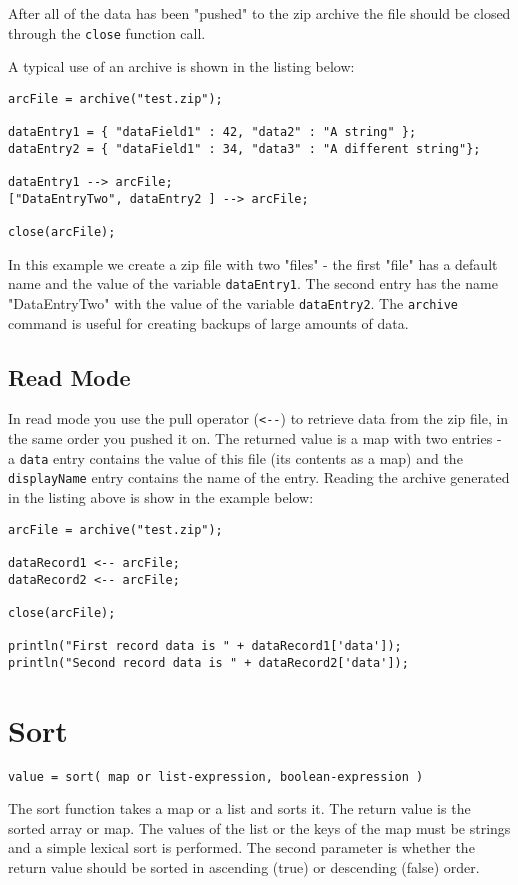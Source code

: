 After all of the data has been "pushed" to the zip archive the file should be closed through the \Verb+close+ function call.

A typical use of an archive is shown in the listing below:
\begin{lstlisting}[caption={Write to Archive example}]
arcFile = archive("test.zip");

dataEntry1 = { "dataField1" : 42, "data2" : "A string" };
dataEntry2 = { "dataField1" : 34, "data3" : "A different string"};

dataEntry1 --> arcFile;
["DataEntryTwo", dataEntry2 ] --> arcFile;

close(arcFile);
\end{lstlisting}

In this example we create a zip file with two "files" - the first "file" has a default name and the value of the variable \Verb+dataEntry1+. The second entry has the name "DataEntryTwo" with the value of the variable \verb+dataEntry2+. The \verb+archive+ command is useful for creating backups of large amounts of \Rapture data.

\subsection{Read Mode}
In read mode you use the pull operator (\Verb+<--+) to retrieve data from the zip file, in the same order you pushed it on. The returned value is a map with two entries - a \verb+data+ entry contains the value of this file (its contents as a map) and the \verb+displayName+ entry contains the name of the entry. Reading the archive generated in the listing above is show in the example below:

\begin{lstlisting}[caption={Read from archive example}]
arcFile = archive("test.zip");

dataRecord1 <-- arcFile;
dataRecord2 <-- arcFile;

close(arcFile);

println("First record data is " + dataRecord1['data']);
println("Second record data is " + dataRecord2['data']);
\end{lstlisting}

\section{Sort}
\begin{Verbatim}
value = sort( map or list-expression, boolean-expression )
\end{Verbatim}
The sort function takes a map or a list and sorts it. The return value is the sorted array or map. The
values of the list or the keys of the map must be strings and a simple lexical sort is performed. The second
parameter is whether the return value should be sorted in ascending (true) or descending (false) order.

